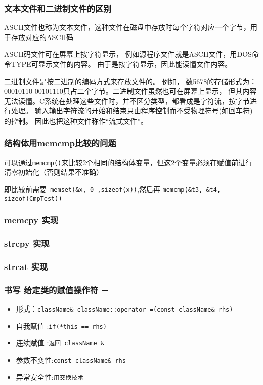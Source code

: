\documentclass[UTF8,a4paper,8pt]{ctexart}
\begin{document}
		\subsubsection{文本文件和二进制文件的区别}
			ASCII文件也称为文本文件，这种文件在磁盘中存放时每个字符对应一个字节，用于存放对应的ASCII码
			
			ASCII码文件可在屏幕上按字符显示， 例如源程序文件就是ASCII文件，用DOS命令TYPE可显示文件的内容。 由于是按字符显示，因此能读懂文件内容。
			
			二进制文件是按二进制的编码方式来存放文件的。 例如， 数5678的存储形式为： 00010110 00101110只占二个字节。二进制文件虽然也可在屏幕上显示， 但其内容无法读懂。C系统在处理这些文件时，并不区分类型，都看成是字符流，按字节进行处理。 输入输出字符流的开始和结束只由程序控制而不受物理符号(如回车符)的控制。 因此也把这种文件称作“流式文件”。
		\subsubsection{结构体用memcmp比较的问题}
				可以通过\verb|memcmp()|来比较2个相同的结构体变量，但这2个变量必须在赋值前进行清零初始化（否则结果不准确）
				
				即比较前需要\verb| memset(&x, 0 ,sizeof(x))|,然后再 \verb|memcmp(&t3, &t4, sizeof(CmpTest))|
				
		\subsubsection{memcpy 实现}
				
		\subsubsection{strcpy 实现}
				
		\subsubsection{strcat 实现}
		
		\subsubsection{书写 给定类的赋值操作符 = }
			\begin{itemize}[itemindent = 1em]
				\item 形式：\verb|className& className::operator =(const className& rhs)|
				\item 自我赋值	:\verb|if(*this == rhs)|
				\item 连续赋值	:\verb|返回 className &|
				\item 参数不变性:\verb|const className& rhs|
				\item 异常安全性:\verb|用交换技术|
			\end{itemize}
			
\end{document}

